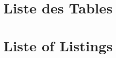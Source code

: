 \documentclass[a4paper,11pt,fleqn]{book}
\begin{document}
\cleardoublepage
{}
\chapter{Liste des Tables}
\listoftables

\cleardoublepage
{}
\chapter{Liste of Listings}
\listoflistings

\appendix





\listoftodos

\backmatter
\end{document}
